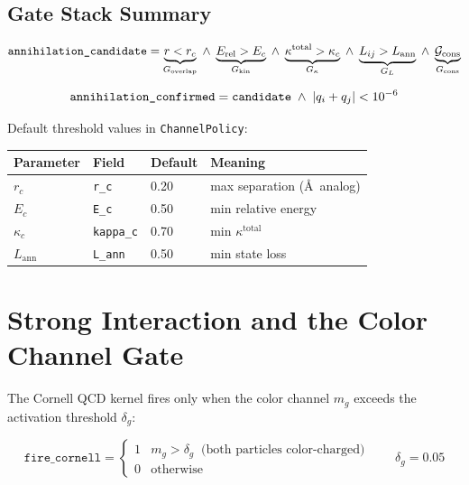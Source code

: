 \documentclass[11pt,a4paper]{article}
\theoremstyle{defbox}
\begin{document}
\subsection{Gate Stack Summary}

\begin{equation}
  \text{\texttt{annihilation\_candidate}} =
  \underbrace{r < r_c}_{G_{\mathrm{overlap}}}
  \;\land\;
  \underbrace{E_{\mathrm{rel}} > E_c}_{G_{\mathrm{kin}}}
  \;\land\;
  \underbrace{\kappa^{\mathrm{total}} > \kappa_c}_{G_\kappa}
  \;\land\;
  \underbrace{L_{ij} > L_{\mathrm{ann}}}_{G_L}
  \;\land\;
  \underbrace{\mathcal{G}_{\mathrm{cons}}}_{G_{\mathrm{cons}}}
\end{equation}

\begin{equation}
  \text{\texttt{annihilation\_confirmed}} =
  \text{\texttt{candidate}} \;\land\; |q_i + q_j| < 10^{-6}
\end{equation}

Default threshold values in \texttt{ChannelPolicy}:

\begin{center}
\begin{tabular}{llll}
\toprule
\textbf{Parameter} & \textbf{Field} & \textbf{Default} & \textbf{Meaning} \\
\midrule
$r_c$              & \texttt{r\_c}     & 0.20 & max separation (\AA\ analog) \\
$E_c$              & \texttt{E\_c}     & 0.50 & min relative energy \\
$\kappa_c$         & \texttt{kappa\_c} & 0.70 & min $\kappa^{\mathrm{total}}$ \\
$L_{\mathrm{ann}}$ & \texttt{L\_ann}   & 0.50 & min state loss \\
\bottomrule
\end{tabular}
\end{center}

\section{Strong Interaction and the Color Channel Gate}
\label{sec:qcd_gate}

The Cornell QCD kernel fires only when the color channel $m_g$ exceeds
the activation threshold $\delta_g$:

\begin{equation}
  \texttt{fire\_cornell} =
  \begin{cases}
	1 & m_g > \delta_g \;\;\text{(both particles color-charged)} \\
	0 & \text{otherwise}
  \end{cases}
  \qquad \delta_g = 0.05
\end{equation}
\end{document}
